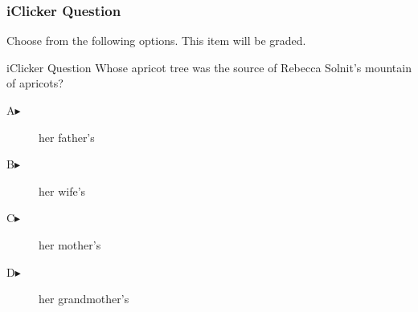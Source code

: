 \begin{frame}
  \frametitle{iClicker Question}
Choose from the following options. This item will be graded.
\begin{block}{iClicker Question}
Whose apricot tree was the source of Rebecca Solnit's mountain of apricots?
\end{block}
\begin{description}
\item[A\hspace{.2in}$\blacktriangleright$] her father's
\item[B\hspace{.2in}$\blacktriangleright$] her wife's
\item[C\hspace{.2in}$\blacktriangleright$] her mother's
\item[D\hspace{.2in}$\blacktriangleright$] her grandmother's
\end{description}
\end{frame}
